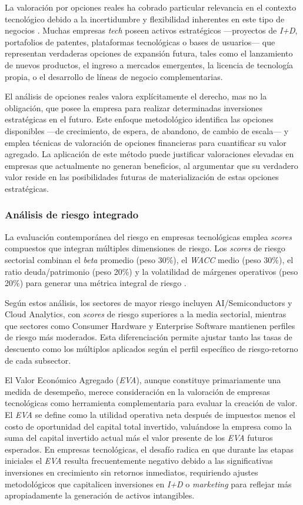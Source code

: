 La valoración por opciones reales ha cobrado particular relevancia en el contexto tecnológico debido a la incertidumbre y flexibilidad inherentes en este tipo de negocios \citep{santos2022}. Muchas empresas \emph{tech} poseen activos estratégicos ---proyectos de \emph{I+D}, portafolios de patentes, plataformas tecnológicas o bases de usuarios--- que representan verdaderas opciones de expansión futura, tales como el lanzamiento de nuevos productos, el ingreso a mercados emergentes, la licencia de tecnología propia, o el desarrollo de líneas de negocio complementarias.

El análisis de opciones reales valora explícitamente el derecho, mas no la obligación, que posee la empresa para realizar determinadas inversiones estratégicas en el futuro. Este enfoque metodológico identifica las opciones disponibles ---de crecimiento, de espera, de abandono, de cambio de escala--- y emplea técnicas de valoración de opciones financieras para cuantificar su valor agregado. La aplicación de este método puede justificar valoraciones elevadas en empresas que actualmente no generan beneficios, al argumentar que su verdadero valor reside en las posibilidades futuras de materialización de estas opciones estratégicas.

\subsubsection{Análisis de riesgo integrado}

La evaluación contemporánea del riesgo en empresas tecnológicas emplea \emph{scores} compuestos que integran múltiples dimensiones de riesgo. Los \emph{scores} de riesgo sectorial combinan el \emph{beta} promedio (peso 30\%), el \emph{WACC} medio (peso 30\%), el ratio deuda/patrimonio (peso 20\%) y la volatilidad de márgenes operativos (peso 20\%) para generar una métrica integral de riesgo \citep{riskmetrics2024}.

Según estos análisis, los sectores de mayor riesgo incluyen AI/Semiconductors y Cloud Analytics, con \emph{scores} de riesgo superiores a la media sectorial, mientras que sectores como Consumer Hardware y Enterprise Software mantienen perfiles de riesgo más moderados. Esta diferenciación permite ajustar tanto las tasas de descuento como los múltiplos aplicados según el perfil específico de riesgo-retorno de cada subsector.

El Valor Económico Agregado (\emph{EVA}), aunque constituye primariamente una medida de desempeño, merece consideración en la valoración de empresas tecnológicas como herramienta complementaria para evaluar la creación de valor. El \emph{EVA} se define como la utilidad operativa neta después de impuestos menos el costo de oportunidad del capital total invertido, valuándose la empresa como la suma del capital invertido actual más el valor presente de los \emph{EVA} futuros esperados. En empresas tecnológicas, el desafío radica en que durante las etapas iniciales el \emph{EVA} resulta frecuentemente negativo debido a las significativas inversiones en crecimiento sin retornos inmediatos, requiriendo ajustes metodológicos que capitalicen inversiones en \emph{I+D} o \emph{marketing} para reflejar más apropiadamente la generación de activos intangibles.

